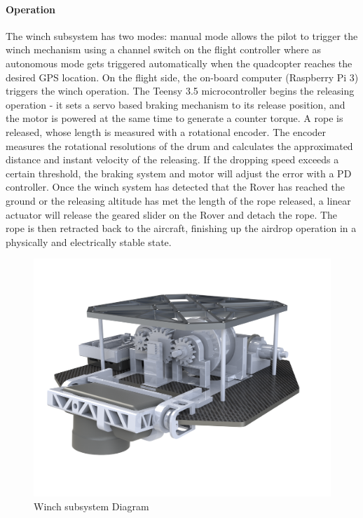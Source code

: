 \paragraph{Operation}
The winch subsystem has two modes: manual mode allows the pilot to trigger the winch mechanism using a channel switch on the flight controller where as autonomous mode gets triggered automatically when the quadcopter reaches the desired GPS location. On the flight side, the on-board computer (Raspberry Pi 3) triggers the winch operation. The Teensy 3.5 microcontroller begins the releasing operation - it sets a servo based braking mechanism to its release position, and the motor is powered at the same time to generate a counter torque. A rope is released, whose length is measured with a rotational encoder. The encoder measures the rotational resolutions of the drum and calculates the approximated distance and instant velocity of the releasing. If the dropping speed exceeds a certain threshold, the braking system and motor will adjust the error with a PD controller. Once the winch system has detected that the Rover has reached the ground or the releasing altitude has met the length of the rope released, a linear actuator will release the geared slider on the Rover and detach the rope. The rope is then retracted back to the aircraft, finishing up the airdrop operation in a physically and electrically stable state. 

\begin{figure}[h]\centering
\includegraphics[width=\linewidth]{figures/PayLoad.png}
\caption{Winch subsystem Diagram}
\label{fig:winch_diagram}
\end{figure}

